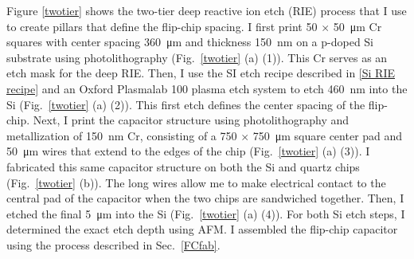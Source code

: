 \documentclass{beavtex_dub_edit}
\begin{document}
Figure \ref{twotier} shows the two-tier deep reactive ion etch (RIE) process that I use to create pillars that define the flip-chip spacing. I first print 50 $\times$ \SI{50}{\micro\meter} Cr squares with center spacing \SI{360}{\micro\meter} and thickness \SI{150}{\nano\meter} on a p-doped Si substrate using photolithography (Fig.\ \ref{twotier} (a) (1)). This Cr serves as an etch mask for the deep RIE. Then, I use the SI etch recipe described in \ref{Si RIE recipe} and an Oxford Plasmalab 100 plasma etch system to etch \SI{460}{\nano\meter} into the Si (Fig.\ \ref{twotier} (a) (2)). This first etch defines the center spacing of the flip-chip. Next, I print the capacitor structure using photolithography and metallization of \SI{150}{\nano\meter} Cr, consisting of a 750 $\times$ \SI{750}{\micro\meter} square center pad and \SI{50}{\micro\meter} wires that extend to the edges of the chip (Fig.\ \ref{twotier} (a) (3)). I fabricated this same capacitor structure on both the Si and quartz chips (Fig.\ \ref{twotier} (b)). The long wires allow me to make electrical contact to the central pad of the capacitor when the two chips are sandwiched together. Then, I etched the final \SI{5}{\micro\meter} into the Si (Fig.\ \ref{twotier} (a) (4)). For both Si etch steps, I determined the exact etch depth using AFM. I assembled the flip-chip capacitor using the process described in Sec.\ \ref{FCfab}. 
 

\end{document}
